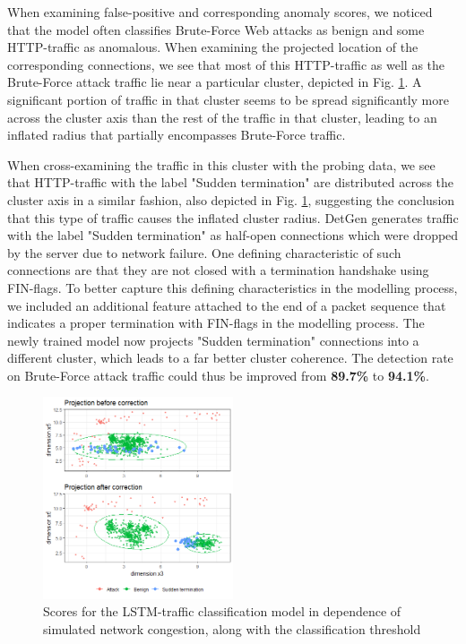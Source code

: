 \documentclass[conference]{IEEEtran}
\begin{document}
When examining false-positive and corresponding anomaly scores, we noticed that the model often classifies Brute-Force Web attacks as benign and some HTTP-traffic as anomalous. When examining the projected location of the corresponding connections, we see that most of this HTTP-traffic as well as the Brute-Force attack traffic lie near a particular cluster, depicted in Fig. \ref{fig:Subspace_projection}. A significant portion of traffic in that cluster seems to be spread significantly more across the cluster axis than the rest of the traffic in that cluster, leading to an inflated radius that partially encompasses Brute-Force traffic. 

When cross-examining the traffic in this cluster with the probing data, we see that HTTP-traffic with the label "Sudden termination" are distributed across the cluster axis in a similar fashion, also depicted in Fig. \ref{fig:Subspace_projection}, suggesting the conclusion that this type of traffic causes the inflated cluster radius. DetGen generates traffic with the label "Sudden termination" as half-open connections which were dropped by the server due to network failure. One defining characteristic of such connections are that they are not closed with a termination handshake using FIN-flags. To better capture this defining characteristics in the modelling process, we included an additional feature attached to the end of a packet sequence that indicates a proper termination with FIN-flags in the modelling process.
The newly trained model now projects "Sudden termination" connections into a different cluster, which leads to a far better cluster coherence. The detection rate on Brute-Force attack traffic could thus be improved from \textbf{89.7\%} to \textbf{94.1\%}.

\begin{figure}
\centering
\includegraphics[width=0.5\textwidth]{images/Subspace_projection_new3.png}
\caption{Scores for the LSTM-traffic classification model in dependence of simulated network congestion, along with the classification threshold}\label{fig:Subspace_projection}
\end{figure}
\end{document}
